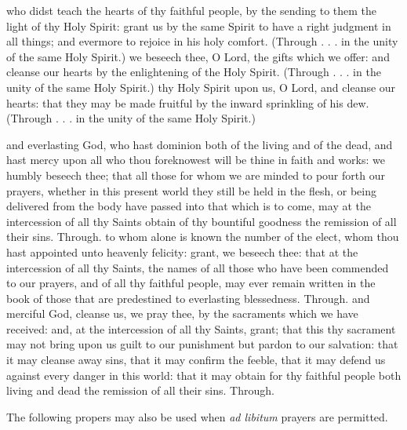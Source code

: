 \begin{multicols}{2}
   \label{SPHolyGhost}
    who didst teach the hearts of thy faithful people, by the sending to them the light of thy Holy Spirit: grant us by the same Spirit to have a right judgment in all things; and evermore to rejoice in his holy comfort. (Through . . . in the unity of the same Holy Spirit.)
    we beseech thee, O Lord, the gifts which we offer: and cleanse our hearts by the enlightening of the Holy Spirit. (Through . . . in the unity of the same Holy Spirit.)
    thy Holy Spirit upon us, O Lord, and cleanse our hearts: that they may be made fruitful by the inward sprinkling of his dew. (Through . . . in the unity of the same Holy Spirit.)

    \label{SPLivingDeparted}
    and everlasting God, who hast dominion both of the living and of the dead, and hast mercy upon all who thou foreknowest will be thine in faith and works: we humbly beseech thee; that all those for whom we are minded to pour forth our prayers, whether in this present world they still be held in the flesh, or being delivered from the body have passed into that which is to come, may at the intercession of all thy Saints obtain of thy bountiful goodness the remission of all their sins. Through.
    to whom alone is known the number of the elect, whom thou hast appointed unto heavenly felicity: grant, we beseech thee: that at the intercession of all thy Saints, the names of all those who have been commended to our prayers, and of all thy faithful people, may ever remain written in the book of those that are predestined to everlasting blessedness. Through.
    and merciful God, cleanse us, we pray thee, by the sacraments which we have received: and, at the intercession of all thy Saints, grant; that this thy sacrament may not bring upon us guilt to our punishment but pardon to our salvation: that it may cleanse away sins, that it may confirm the feeble, that it may defend us against every danger in this world: that it may obtain for thy faithful people both living and dead the remission of all their sins. Through.
 \end{multicols}
\vspace{-1ex}
\begin{rubric}
    The following propers may also be used when \emph{ad libitum} prayers are permitted.
\end{rubric}
